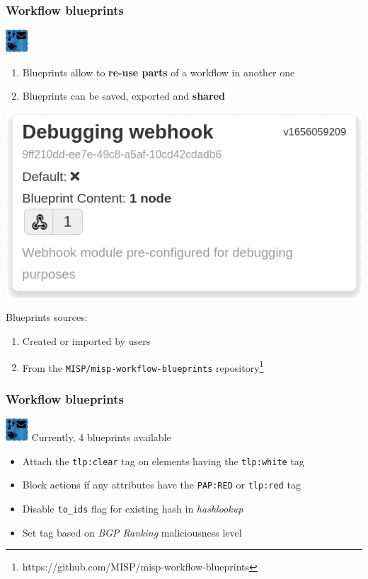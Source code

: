 \begin{frame}
    \frametitle{Workflow blueprints}
    \hspace*{0.9\textwidth}\includegraphics[width=32px]{pictures/blueprint-32.png}
    \vspace*{-2em}
    \begin{enumerate}
        \item Blueprints allow to \textbf{re-use parts} of a workflow in another one
        \item Blueprints can be saved, exported and \textbf{shared}
    \end{enumerate}
    \begin{center}
        \includegraphics[width=0.5\linewidth]{pictures/blueprint-debugging.png}
    \end{center}
    Blueprints sources:
    \begin{enumerate}
        \item Created or imported by users
        \item From the \texttt{MISP/misp-workflow-blueprints} repository\footnote{\scriptsize https://github.com/MISP/misp-workflow-blueprints}
    \end{enumerate}
\end{frame}

\begin{frame}
    \frametitle{Workflow blueprints}
    \hspace*{0.9\textwidth}\includegraphics[width=32px]{pictures/blueprint-32.png}
    \vspace*{-2em}
    Currently, 4 blueprints available
    \begin{itemize}
        \item Attach the \texttt{tlp:clear} tag on elements having the \texttt{tlp:white} tag
        \item Block actions if any attributes have the \texttt{PAP:RED} or \texttt{tlp:red} tag
        \item Disable \texttt{to\_ids} flag for existing hash in \textit{hashlookup}
        \item Set tag based on \textit{BGP Ranking} maliciousness level
    \end{itemize}
\end{frame}

